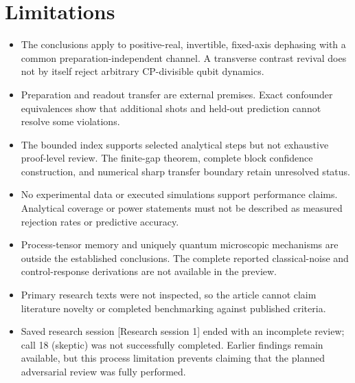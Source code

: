 \documentclass[11pt]{article}
\begin{document}
\section{Limitations}
\begin{itemize}
\item The conclusions apply to positive-real, invertible, fixed-axis dephasing with a common preparation-independent channel. A transverse contrast revival does not by itself reject arbitrary CP-divisible qubit dynamics.
\item Preparation and readout transfer are external premises. Exact confounder equivalences show that additional shots and held-out prediction cannot resolve some violations.
\item The bounded index supports selected analytical steps but not exhaustive proof-level review. The finite-gap theorem, complete block confidence construction, and numerical sharp transfer boundary retain unresolved status.
\item No experimental data or executed simulations support performance claims. Analytical coverage or power statements must not be described as measured rejection rates or predictive accuracy.
\item Process-tensor memory and uniquely quantum microscopic mechanisms are outside the established conclusions. The complete reported classical-noise and control-response derivations are not available in the preview.
\item Primary research texts were not inspected, so the article cannot claim literature novelty or completed benchmarking against published criteria.
\item Saved research session [Research session 1] ended with an incomplete review; call 18 (skeptic) was not successfully completed. Earlier findings remain available, but this process limitation prevents claiming that the planned adversarial review was fully performed.
\end{itemize}
\end{document}
